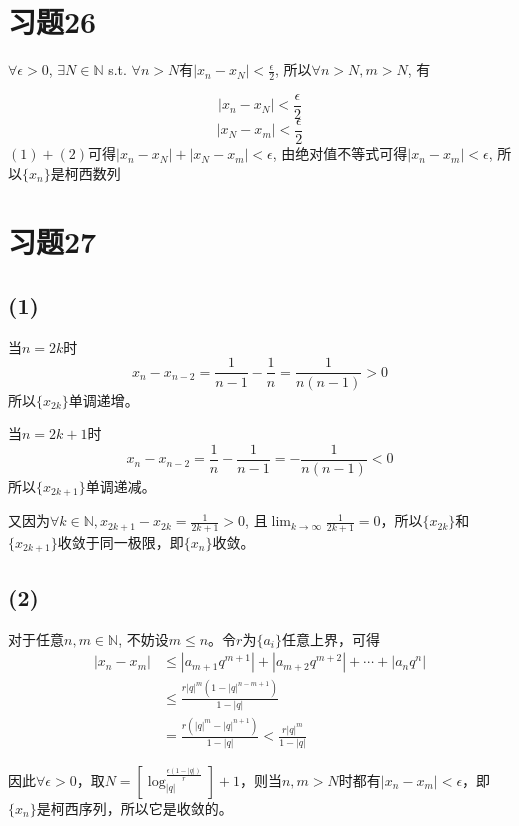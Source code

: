 \documentclass[a4paper,11pt]{article}
\begin{document}
\section*{习题26}
$\forall \epsilon > 0$, $\exists N \in \mathbb{N}$ s.t. $\forall n > N$有$|x_n-x_N| < \frac{\epsilon}{2}$, 所以$\forall n > N, m > N$, 有

\begin{equation}
	|x_n - x_N| < \frac{\epsilon}{2}
\end{equation}
\begin{equation}
	|x_N - x_m| < \frac{\epsilon}{2}
\end{equation}
$(1)+(2)$可得$|x_n - x_N| + |x_N - x_m| < \epsilon$, 由绝对值不等式可得$|x_n - x_m| < \epsilon$, 所以$\{x_n\}$是柯西数列
\section*{习题27}
\subsection*{(1)}
当$n=2k$时 $$x_n - x_{n-2} = \frac{1}{n-1} - \frac{1}{n} = \frac{1}{n(n-1)} > 0$$ 所以$\{x_{2k}\}$单调递增。

当$n=2k+1$时 $$x_n - x_{n-2} = \frac{1}{n} - \frac{1}{n-1} = -\frac{1}{n(n-1)} < 0$$ 所以$\{x_{2k+1}\}$单调递减。

又因为$\forall k \in \mathbb{N}, x_{2k + 1} - x_{2k} = \frac{1}{2k+1} > 0$, 且$\displaystyle \lim_{k\rightarrow \infty}\frac{1}{2k+1} = 0$，所以$\{x_{2k}\}$和$\{x_{2k+1}\}$收敛于同一极限，即$\{x_n\}$收敛。
\subsection*{(2)}
对于任意$n, m \in \mathbb{N}$, 不妨设$m \le n$。令$r$为$\{a_i\}$任意上界，可得
\begin{align*}
	|x_n - x_m| &\le |a_{m+1}q^{m+1}| + |a_{m+2}q^{m+2}| + \cdots +  |a_{n}q^{n}| \\
			&\le \frac{r|q|^m(1-|q|^{n-m+1})}{1-|q|} \\
			&= \frac{r(|q|^m-|q|^{n+1})}{1-|q|} < \frac{r|q|^m}{1-|q|}
\end{align*}

因此$\forall \epsilon > 0$，取$N = [\log_|q|^{\frac{\epsilon(1-|q|)}{r}}] + 1$，则当$n, m > N$时都有$|x_n - x_m| < \epsilon$，即$\{x_n\}$是柯西序列，所以它是收敛的。
\end{document}
